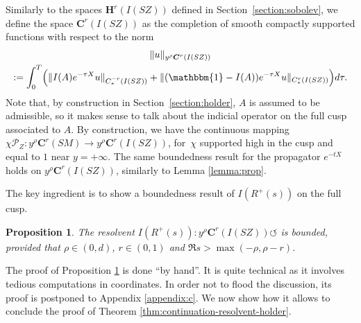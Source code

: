 \documentclass[JEP,XML,SOM,Unicode,NoFloatCountersInSection]{cedram}
\newcommand{\bC}{\boldsymbol{C}}
\newcommand{\bH}{\boldsymbol{H}}
\newcommand{\mc}{\mathcal}
\newcommand{\ZZ}{I(SZ)}
\theoremstyle{plain}
\newtheorem{proposition}{Proposition}[section]
\theoremstyle{definition}
\begin{document}
Similarly to the spaces $\bH^r(\ZZ)$ defined in Section~\ref{section:sobolev}, we define the space $\bC^r(\ZZ)$ as the completion of smooth compactly supported functions with respect to the norm
\begin{multline}
\label{equation:aniso-cusp}
\|u\|_{y^\rho \bC^r(\ZZ)}\\
:= \int_0^T \Bigl(\|I(A)e^{-\tau X} u\|_{C^{-r}_*(\ZZ)} + \|(\mathbbm{1}-I(A))e^{-\tau X} u\|_{C^r_*(\ZZ)}\Bigr) d\tau.
\end{multline}
Note that, by construction in Section~\ref{section:holder}, $A$ is assumed to be admissible, so it makes sense to talk about the indicial operator on the full cusp associated to $A$. By construction, we have the continuous mapping $\chi \mc{P}_Z : y^\rho \bC^r(SM) \to y^\rho \bC^r(\ZZ)$, for~$\chi$ supported high in the cusp and equal to $1$ near $y=+\infty$. The same boundedness result for the propagator $e^{-tX}$ holds on $y^\rho \bC^r(\ZZ)$, similarly to Lemma \ref{lemma:prop}.

The key ingredient is to show a boundedness result of $I(R^+(s))$ on the full cusp.

\begin{proposition}\label{prop:bound-indicial-resolvent-holder}
The resolvent $I(R^+(s)) : y^\rho \bC^r(\ZZ) \circlearrowleft$ is bounded, provided that $\rho \in (0,d)$, $r \in (0,1)$ and $\Re s > \max(-\rho,\rho-r)$.
\end{proposition}

The proof of Proposition \ref{prop:bound-indicial-resolvent-holder} is done ``by hand''. It is quite technical as it involves tedious computations in coordinates. In order not to flood the discussion, its proof is postponed to Appendix \ref{appendix:c}. We now show how it allows to conclude the proof of Theorem \ref{thm:continuation-resolvent-holder}.
\end{document}
